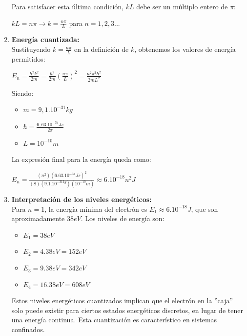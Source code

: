 \documentclass[a4paper]{article}
\begin{document}
\begin{enumerate}
				Para satisfacer esta última condición, $kL$ debe ser un múltiplo entero de $\pi$:

				\begin{center}
					$kL = n \pi \rightarrow k = \frac{n \pi}{L}$ \hspace{5mm} para $n = 1,2,3...$
				\end{center}

			\item \indent \textbf{Energía cuantizada:} \\
				Sustituyendo $k = \frac{n \pi}{L}$ en la definición de $k$, obtenemos los valores de energía permitidos:

				\begin{center}
					$E_n = \frac{\hbar ^2 k^2}{2m} = \frac{\hbar ^2}{2m} (\frac{n \pi}{L})^2 = \frac{n^2 \pi^2 \hbar^2}{2mL^2}$
				\end{center}

				Siendo:

				\begin{itemize}
					\item $m = 9,1 . 10^{-31} kg$
					\item $\hbar = \frac {6,63 . 10^{-34} Js}{2 \pi}$
					\item $L = 10^{-10}m$
				\end{itemize}

				La expresión final para la energía queda como:

				\begin{center}
					$E_n = \frac {(n^2)(6.63 . 10^{-34} Js)^2}{(8)(9.1 . 10^{-31 kg}) (10^{-10}m)} \approx 6 . 10^{-18}n^2 J$
				\end{center}

			\item \indent \textbf{Interpretación de los niveles energéticos:} \\
				Para $n = 1$, la energía mínima del electrón es $E_1 \approx 6 . 10^{-18} J$, que son aproximadamente $38eV$. Los niveles de energía son: 

				\begin{itemize}
					\item $E_1 = 38eV$
					\item $E_2 = 4 . 38eV = 152 eV$
					\item $E_3 = 9 . 38eV = 342 eV$
					\item $E_4 = 16 . 38eV = 608 eV$
				\end{itemize}

				Estos niveles energéticos cuantizados implican que el electrón en la ''caja'' solo puede existir para ciertos estados energéticos discretos, en lugar de tener una energía continua. Esta cuantización es característico en sistemas confinados.

	\end{enumerate}
		
\end{document}
